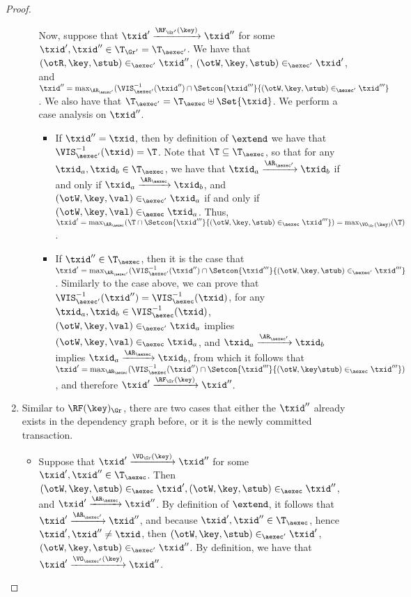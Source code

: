 \begin{proof}
\begin{enumerate}
\begin{itemize}
Now, suppose that $\txid' \xrightarrow{\RF_{\Gr'}(\key)} \txid''$ for some $\txid', \txid'' \in \T_{\Gr'} = 
\T_{\aexec'}$. We have that $ (\otR, \key, \stub) \in_{\aexec'} \txid''$, 
$(\otW, \key, \stub) \in_{\aexec'} \txid'$, and $\txid'' = \max_{\AR_{\aexec'}}(\VIS_{\aexec'}^{-1}(\txid'') 
\cap \Setcon{ \txid''' }{ (\otW, \key, \stub) \in_{\aexec'} \txid'''}$. 
We also have that $\T_{\aexec'} = \T_{\aexec} \uplus \Set{\txid}$. We perform a case 
analysis on $\txid''$. 

\begin{itemize}
\item If $\txid'' = \txid$, then by definition of $\extend$ we have that 
$\VIS^{-1}_{\aexec'}(\txid) = \T$. Note that $\T \subseteq \T_{\aexec}$, so that 
for any $\txid_{a}, \txid_{b} \in \T_{\aexec}$, we have that $\txid_{a} \xrightarrow{\AR_{\aexec'}} \txid_{b}$ 
if and only if $\txid_{a} \xrightarrow{\AR_{\aexec}} \txid_{b}$, 
and $(\otW, \key, \val) \in_{\aexec'} \txid_{a}$ if and only if $(\otW, \key, \val) \in_{\aexec} \txid_{a}$. 
Thus, $\txid' = \max_{\AR_{\aexec}}(\T 
\cap \Setcon{\txid''' }{ (\otW, \key, \stub) \in_{\aexec} \txid'''}) = \max_{\VO_{\Gr}(\key)}(\T)$. 

\item If $\txid'' \in \T_{\aexec}$, then it is the case that 
    $\txid' = \max_{\AR_{\aexec'}}(\VIS^{-1}_{\aexec'}(\txid'') \cap \Setcon{ \txid''' }{ (\otW, \key, \stub) \in_{\aexec'} \txid'''}$. 
Similarly to the case above, we can prove that $\VIS^{-1}_{\aexec'}(\txid'') = \VIS^{-1}_{\aexec}(\txid)$, 
for any $\txid_{a}, \txid_{b} \in \VIS^{-1}_{\aexec}(\txid)$, $(\otW, \key, \val) \in_{\aexec'} \txid_{a}$ 
implies $(\otW, \key, \val) \in_{\aexec} \txid_{a}$, and $\txid_{a} \xrightarrow{\AR_{\aexec'}} \txid_{b}$ 
implies $\txid_{a} \xrightarrow{\AR_{\aexec}} \txid_{b}$, from which it follows that 
$\txid' = \max_{\AR_{\aexec}}(\VIS^{-1}_{\aexec}(\txid'') \cap \Setcon{ \txid''' }{ (\otW, \key \stub) \in_{\aexec} \txid'''})$, 
and therefore $\txid' \xrightarrow{\RF_{\Gr}(\key)} \txid''$.
\end{itemize}
\end{itemize}

\item 
Similar to \( \RF(\key)_{\Gr} \), there are two cases that either the \( \txid'' \) already exists in the dependency graph before,
or it is the newly committed transaction.
\begin{itemize}
\item Suppose that $\txid' \xrightarrow{\VO_{\Gr}(\key)} \txid''$ for some $\txid', \txid'' \in \T_{\aexec}$. 
Then $(\otW,\key,\stub) \in_{\aexec} \txid', (\otW, \key, \stub) \in_{\aexec} \txid''$, and $\txid' \xrightarrow{\AR_{\aexec}} \txid''$. 
By definition of $\extend$, it follows that $\txid' \xrightarrow{\AR_{\aexec'}} \txid''$, and because 
$\txid', \txid'' \in \T_{\aexec}$, hence $\txid', \txid'' \neq \txid$, then 
$(\otW,\key, \stub) \in_{\aexec'} \txid'$, $(\otW, \key, \stub) \in_{\aexec'} \txid''$. By definition, 
we have that $\txid' \xrightarrow{\VO_{\aexec'}(\key)} \txid''$.


\end{itemize}
\end{enumerate}
\end{proof}
